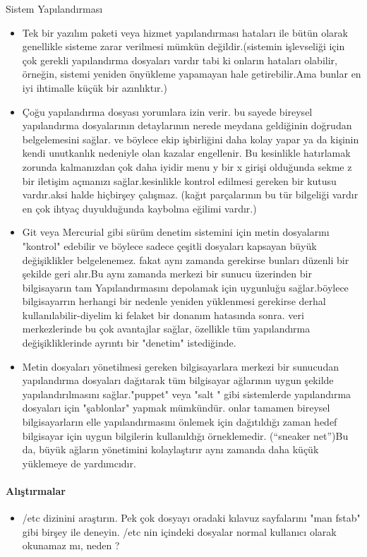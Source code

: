 \begin{section}{Sistem Yapılandırması}
\begin{itemize}
\item Tek bir yazılım paketi veya hizmet yapılandırması hataları ile bütün olarak genellikle sisteme zarar verilmesi mümkün değildir.(sistemin işlevseliği için çok gerekli yapılandırma dosyaları vardır tabi ki onların hataları olabilir, örneğin, sistemi yeniden önyükleme yapamayan hale getirebilir.Ama bunlar en iyi ihtimalle küçük bir azınlıktır.)
\item Çoğu yapılandırma dosyası yorumlara izin verir. bu sayede bireysel yapılandırma dosyalarının detaylarının nerede meydana geldiğinin doğrudan  belgelemesini sağlar. ve böylece ekip işbirliğini daha kolay yapar ya da kişinin kendi unutkanlık nedeniyle olan kazalar engellenir. Bu kesinlikle hatırlamak zorunda kalmanızdan çok daha iyidir menu y bir x girişi olduğunda sekme z bir iletişim açmanızı sağlar.kesinlikle kontrol edilmesi gereken bir kutusu vardır.aksi halde hiçbirşey çalışmaz. (kağıt parçalarının bu tür bilgeliği vardır en çok ihtyaç duyulduğunda kaybolma eğilimi vardır.)
\item Git veya Mercurial gibi sürüm denetim sistemini için metin dosyalarını "kontrol" edebilir ve  böylece sadece çeşitli dosyaları kapsayan büyük değişiklikler belgelenemez. fakat aynı zamanda gerekirse bunları düzenli bir şekilde geri alır.Bu aynı zamanda merkezi bir sunucu üzerinden bir bilgisayarın tam Yapılandırmasını depolamak için  uygunluğu sağlar.böylece bilgisayarrın herhangi bir nedenle yeniden yüklenmesi gerekirse derhal kullanılabilir-diyelim ki felaket bir donanım hatasında sonra. veri merkezlerinde bu  çok avantajlar sağlar, özellikle tüm yapılandırma değişikliklerinde ayrıntı bir "denetim" istediğinde.
\item Metin dosyaları yönetilmesi gereken bilgisayarlara merkezi bir sunucudan yapılandırma dosyaları dağıtarak tüm bilgisayar ağlarının uygun şekilde yapılandırılmasını sağlar."puppet" veya "salt " gibi sistemlerde yapılandırma dosyaları için "şablonlar" yapmak mümkündür. onlar tamamen bireysel bilgisayarların elle yapılandırmasını önlemek için dağıtıldığı zaman hedef bilgisayar için uygun bilgilerin kullanıldığı  örneklemedir. (“sneaker net”)Bu da, büyük ağların yönetimini kolaylaştırır  aynı zamanda daha küçük yüklemeye de yardımcıdır.
\end{itemize}
\paragraph{Alıştırmalar}{
\begin{itemize}
 \item /etc dizinini araştırın. Pek çok dosyayı oradaki kılavuz sayfalarını "man fstab" gibi birşey ile deneyin. /etc nin içindeki dosyalar normal kullanıcı olarak okunamaz mı,  neden ?
\end{itemize}}
\end{section}
